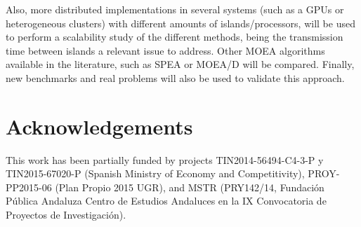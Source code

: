 \documentclass[preprint]{elsarticle}
\begin{document}
Also, more distributed implementations in several systems (such as a
GPUs or heterogeneous clusters) with different amounts of
islands/processors, will be used to perform a scalability study of the
different methods, being the transmission time between islands a
relevant issue to address. Other MOEA algorithms available in the literature, such as SPEA or MOEA/D will be compared. Finally, new benchmarks and real problems
will also be  used to validate this approach.  



\section*{Acknowledgements}
This work has been partially funded by projects TIN2014-56494-C4-3-P y TIN2015-67020-P (Spanish Ministry of Economy and Competitivity), PROY-PP2015-06 (Plan Propio 2015 UGR),  and  MSTR (PRY142/14, Fundaci\'on P\'ublica Andaluza Centro de Estudios Andaluces en la IX Convocatoria de Proyectos de Investigaci\'on).






\end{document}

